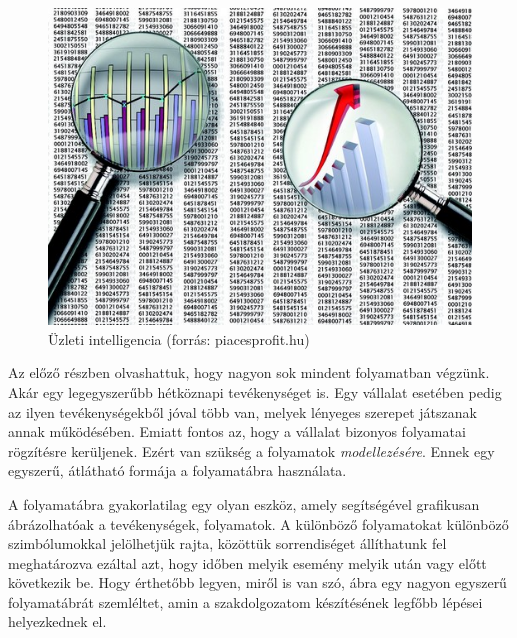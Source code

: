 
\begin{figure}[h]
\centering
\includegraphics[scale=0.5]{images/uzleti_intelligencia.png}
\caption{Üzleti intelligencia (forrás: piacesprofit.hu)}
\label{fig:uzlint}
\end{figure}




Az előző részben olvashattuk, hogy nagyon sok mindent folyamatban végzünk. Akár egy legegyszerűbb hétköznapi tevékenységet is. Egy vállalat esetében pedig az ilyen tevékenységekből jóval több van, melyek lényeges szerepet játszanak annak működésében. Emiatt fontos az, hogy a vállalat bizonyos folyamatai rögzítésre kerüljenek. Ezért van szükség a folyamatok \textit{modellezésére}. Ennek egy egyszerű, átlátható formája a folyamatábra használata.



A folyamatábra gyakorlatilag egy olyan eszköz, amely segítségével grafikusan ábrázolhatóak a tevékenységek, folyamatok. A különböző folyamatokat különböző szimbólumokkal jelölhetjük rajta, közöttük sorrendiséget állíthatunk fel meghatározva ezáltal azt, hogy időben melyik esemény melyik után vagy előtt következik be. Hogy érthetőbb legyen, miről is van szó,  ábra egy nagyon egyszerű folyamatábrát szemléltet, amin a szakdolgozatom készítésének legfőbb lépései helyezkednek el.

